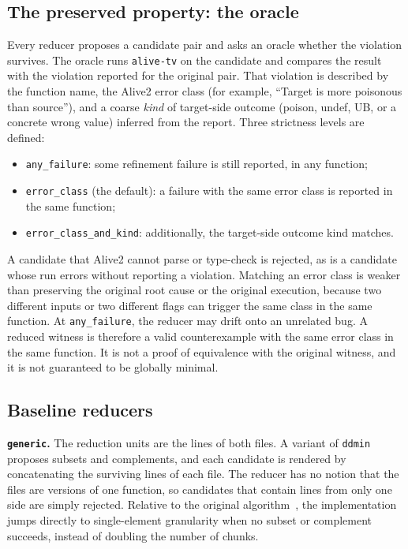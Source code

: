 \documentclass[conference]{IEEEtran}
\newcommand{\cn}[1]{\texttt{#1}}   %
\begin{document}
\subsection{The preserved property: the oracle}

Every reducer proposes a candidate pair and asks an oracle whether the violation survives. The oracle runs \texttt{alive-tv} on the candidate and compares the result with the violation reported for the original pair. That violation is described by the function name, the Alive2 error class (for example, ``Target is more poisonous than source''), and a coarse \emph{kind} of target-side outcome (poison, undef, UB, or a concrete wrong value) inferred from the report. Three strictness levels are defined:
\begin{itemize}
\item \cn{any\_failure}: some refinement failure is still reported, in any function;
\item \cn{error\_class} (the default): a failure with the same error class is reported in the same function;
\item \cn{error\_class\_and\_kind}: additionally, the target-side outcome kind matches.
\end{itemize}

A candidate that Alive2 cannot parse or type-check is rejected, as is a candidate whose run errors without reporting a violation. Matching an error class is weaker than preserving the original root cause or the original execution, because two different inputs or two different flags can trigger the same class in the same function. At \cn{any\_failure}, the reducer may drift onto an unrelated bug. A reduced witness is therefore a valid counterexample with the same error class in the same function. It is not a proof of equivalence with the original witness, and it is not guaranteed to be globally minimal.

\subsection{Baseline reducers}

\textbf{\cn{generic}.} The reduction units are the lines of both files. A variant of \texttt{ddmin} proposes subsets and complements, and each candidate is rendered by concatenating the surviving lines of each file. The reducer has no notion that the files are versions of one function, so candidates that contain lines from only one side are simply rejected. Relative to the original algorithm~\cite{zeller2002dd}, the implementation jumps directly to single-element granularity when no subset or complement succeeds, instead of doubling the number of chunks.
\end{document}
